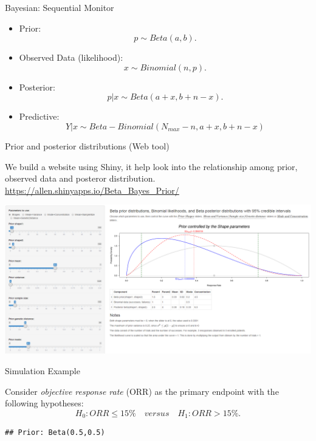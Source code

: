 \begin{frame}{Bayesian: Sequential Monitor}

\begin{itemize}
\item
  Prior: \[p \sim Beta(a, b).\]
\item
  Observed Data (likelihood): \[x \sim Binomial(n,p). \]
\item
  Posterior: \[p|x \sim Beta(a + x, b + n - x).\]
\item
  Predictive: \[Y|x \sim Beta-Binomial(N_{max}-n, a + x, b + n - x)\]
\end{itemize}

\end{frame}

\begin{frame}{Prior and posterior distributions (Web tool)}

We build a website using Shiny, it help look into the relationship among
prior, observed data and posteror distribution.
\url{https://allen.shinyapps.io/Beta_Bayes_Prior/}

\includegraphics{demo.png}

\end{frame}

\begin{frame}[fragile]{Simulation Example}

Consider \emph{objective response rate} (ORR) as the primary endpoint
with the following hypotheses:
\[H_0: ORR \le 15\% \quad versus \quad H_1: ORR > 15\%.\]

\begin{verbatim}
## Prior: Beta(0.5,0.5)
\end{verbatim}


\end{frame}

